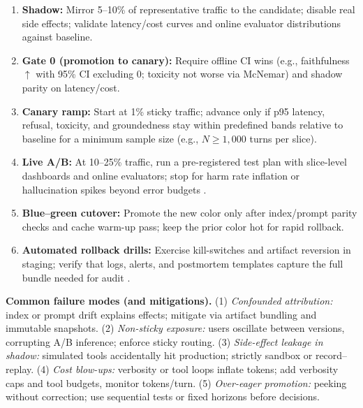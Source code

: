 \begin{tcolorbox}[
  title={\textbf{A Worked Rollout Playbook}},
  colback=green!5,
  colframe=green!40!black,
  colbacktitle=green!20,
  coltitle=black,
  fonttitle=\bfseries,
  boxrule=0.7pt,
  arc=4pt,
  left=5mm, right=5mm, top=4mm, bottom=4mm,
  before skip=6pt,
  after skip=6pt
]
\begin{enumerate}[leftmargin=1.5em, itemsep=4pt, topsep=2pt]
\item \textbf{Shadow:} Mirror 5--10\% of representative traffic to the candidate; disable real side effects; validate latency/cost curves and online evaluator distributions against baseline.  
\item \textbf{Gate 0 (promotion to canary):} Require offline CI wins (e.g., faithfulness $\uparrow$ with 95\% CI excluding 0; toxicity not worse via McNemar) and shadow parity on latency/cost.  
\item \textbf{Canary ramp:} Start at 1\% sticky traffic; advance only if p95 latency, refusal, toxicity, and groundedness stay within predefined bands relative to baseline for a minimum sample size (e.g., $N \ge 1{,}000$ turns per slice).  
\item \textbf{Live A/B:} At 10--25\% traffic, run a pre-registered test plan with slice-level dashboards and online evaluators; stop for harm rate inflation or hallucination spikes beyond error budgets \cite{mlflow_llm_eval,phoenix_rag,trulens}.  
\item \textbf{Blue--green cutover:} Promote the new color only after index/prompt parity checks and cache warm-up pass; keep the prior color hot for rapid rollback.  
\item \textbf{Automated rollback drills:} Exercise kill-switches and artifact reversion in staging; verify that logs, alerts, and postmortem templates capture the full bundle needed for audit \cite{rohan_llmops}.
\end{enumerate}
\end{tcolorbox}

\medskip
\noindent\textbf{Common failure modes (and mitigations).}
(1) \emph{Confounded attribution:} index or prompt drift explains effects; mitigate via artifact bundling and immutable snapshots.  
(2) \emph{Non-sticky exposure:} users oscillate between versions, corrupting A/B inference; enforce sticky routing.  
(3) \emph{Side-effect leakage in shadow:} simulated tools accidentally hit production; strictly sandbox or record--replay.  
(4) \emph{Cost blow-ups:} verbosity or tool loops inflate tokens; add verbosity caps and tool budgets, monitor tokens/turn.  
(5) \emph{Over-eager promotion:} peeking without correction; use sequential tests or fixed horizons before decisions.

